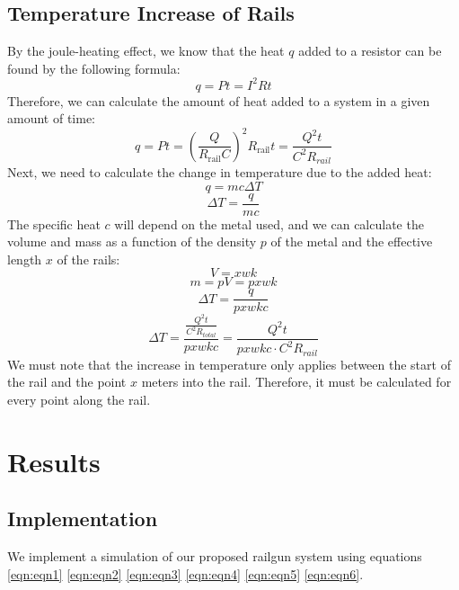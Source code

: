 \documentclass[12pt]{article}
\begin{document}
\subsection{Temperature Increase of Rails}
By the joule-heating effect, we know that the heat $q$ added to a resistor can be found by the following formula:
\begin{equation}
    q = Pt = I^2 R t 
\end{equation}
Therefore, we can calculate the amount of heat added to a system in a given amount of time:
\begin{equation}
    q = Pt = \left(\frac{Q}{R_{\text{rail}}C}\right)^2 R_{\text{rail}} t = \frac{Q^2 t}{C^2 R_{rail}}
\end{equation}
Next, we need to calculate the change in temperature due to the added heat:
\begin{equation}
    q = mc\Delta T
\end{equation}
\begin{equation}
    \Delta T = \frac{q}{mc}
\end{equation}
The specific heat $c$ will depend on the metal used, and we can calculate the volume and mass as a function of the density $p$ of the metal and the effective length $x$ of the rails:
\begin{equation}
    V = xwk
\end{equation}
\begin{equation}
    m = pV = pxwk
\end{equation}
\begin{equation}
    \Delta T = \frac{q}{pxwkc}
\end{equation}
\begin{equation}
    \Delta T = \frac{\frac{Q^2 t}{C^2 R_{total}}}{pxwkc} = \frac{Q^2 t}{pxwkc \cdot C^2 R_{rail}}
    \label{eqn:eqn6}
\end{equation}
We must note that the increase in temperature only applies between the start of the rail and the point $x$ meters into the rail. Therefore, it must be calculated for every point along the rail.

\section{Results}

\subsection{Implementation}
We implement a simulation of our proposed railgun system using equations \eqref{eqn:eqn1} \eqref{eqn:eqn2} \eqref{eqn:eqn3} \eqref{eqn:eqn4} \eqref{eqn:eqn5} \eqref{eqn:eqn6}.
\end{document}
